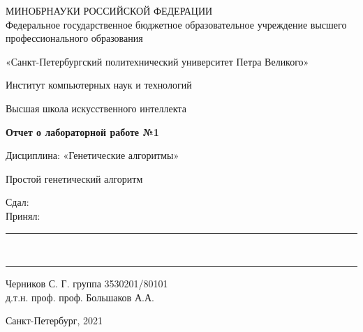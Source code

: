 \thispagestyle{empty}
\begin{center}
	{
		{\Large МИНОБРНАУКИ РОССИЙСКОЙ ФЕДЕРАЦИИ\\
			\large Федеральное государственное бюджетное образовательное учреждение высшего профессионального образования\\
			\Large
			\par
			«Санкт-Петербургский политехнический университет Петра Великого»}
		\par
		Институт компьютерных наук и технологий
		\par
		Высшая школа искусственного интеллекта
	}
\end{center}
\vspace{5.2cm}
\begin{center}
	{
		\Large
		{\bf Отчет о лабораторной работе №1}
		\par
		\par 
		\large
		Дисциплина: «Генетические алгоритмы»
		
		\par
		\vspace{1cm}
		\LARGE Простой генетический алгоритм
	}
\end{center}

\vspace{4cm}
{ 
	\onehalfspacing
	\centering
	\normalsize
	\parbox{2cm}
	{Сдал:\\
		Принял:}
	\parbox{3.5cm}
	{\vspace{0.4cm}
		
		\rule{3cm}{0.5pt}\\%
		\rule{3cm}{0.5pt}
	}
	\parbox{8.2cm}
	{ %
		Черников С. Г. группа 3530201/80101\\
		д.т.н. проф. проф. Большаков А.А.
	}
}
{
	\vspace{0.5cm}
	\begin{center}
		Санкт-Петербург, 2021
	\end{center}
}